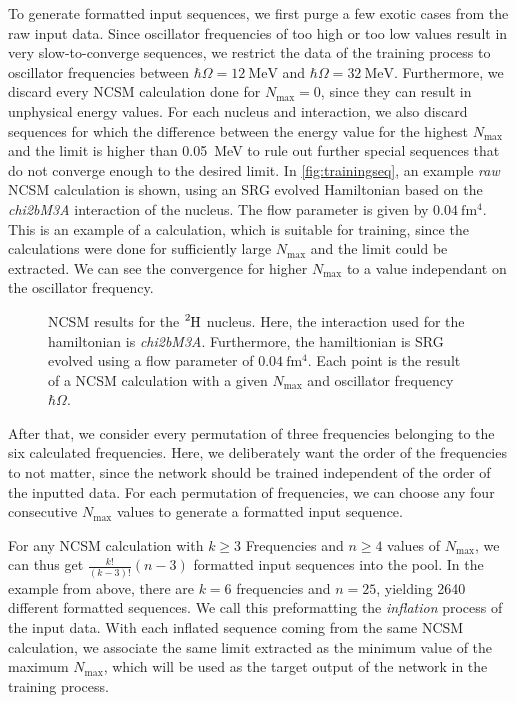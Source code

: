 To generate formatted input sequences, we first purge a few exotic cases from the raw input data. Since oscillator frequencies of too high or too low values result in very slow-to-converge sequences, we restrict the data of the training process to oscillator frequencies between $\hbar\Omega=\SI{12}{\mega\electronvolt}$ and $\hbar\Omega=\SI{32}{\mega\electronvolt}$. Furthermore, we discard every NCSM calculation done for $N_\mathrm{max} = 0$, since they can result in unphysical energy values. For each nucleus and interaction, we also discard sequences for which the difference between the energy value for the highest $N_\mathrm{max}$ and the limit is higher than \SI{0.05}{\mega\electronvolt} to rule out further special sequences that do not converge enough to the desired limit.
In \autoref{fig:trainingseq}, an example \textit{raw} NCSM calculation is shown, using an SRG evolved Hamiltonian based on the \textit{chi2bM3A} interaction of the  nucleus. The flow parameter is given by $\SI{0.04}{\femto\metre^4}$. This is an example of a calculation, which is suitable for training, since the calculations were done for sufficiently large $N_\mathrm{max}$ and the limit could be extracted. We can see the convergence for higher $N_\mathrm{max}$ to a value independant on the oscillator frequency.

\begin{figure}[H]
  \centering
  
  \caption{NCSM results for the $\n{2}{H}$ nucleus. Here, the interaction used for the hamiltonian is \textit{chi2bM3A}. Furthermore, the hamiltionian is SRG evolved using a flow parameter of $\SI{0.04}{\femto\metre^4}$. Each point is the result of a NCSM calculation with a given $N_\mathrm{max}$ and oscillator frequency $\hbar \Omega$.}
  \label{fig:trainingseq}
\end{figure}

After that, we consider every permutation of three frequencies belonging to the six calculated frequencies. Here, we deliberately want the order of the frequencies to not matter, since the network should be trained independent of the order of the inputted data. For each permutation of frequencies, we can choose any four consecutive $N_\mathrm{max}$ values to generate a formatted input sequence.

For any NCSM calculation with $k \geq 3$ Frequencies and $n \geq 4 $ values of $N_\mathrm{max}$, we can thus get $\frac{k!}{(k-3)!} (n-3)$ formatted input sequences into the pool. In the example from above, there are $k=6$ frequencies and $n = 25$, yielding 2640 different formatted sequences. We call this preformatting the \textit{inflation} process of the input data. With each inflated sequence coming from the same NCSM calculation, we associate the same limit extracted as the minimum value of the maximum $N_\mathrm{max}$, which will be used as the target output of the network in the training process.

